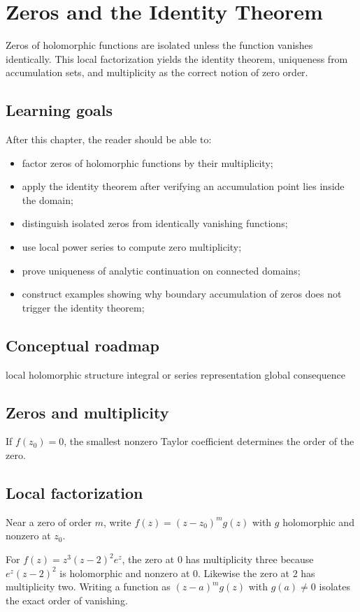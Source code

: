 \chapter{Zeros and the Identity Theorem}
\label{ch:iv07}

Zeros of holomorphic functions are isolated unless the function vanishes identically. This local factorization yields the identity theorem, uniqueness from accumulation sets, and multiplicity as the correct notion of zero order.

\section*{Learning goals}
After this chapter, the reader should be able to:
\begin{itemize}
\item factor zeros of holomorphic functions by their multiplicity;
\item apply the identity theorem after verifying an accumulation point lies inside the domain;
\item distinguish isolated zeros from identically vanishing functions;
\item use local power series to compute zero multiplicity;
\item prove uniqueness of analytic continuation on connected domains;
\item construct examples showing why boundary accumulation of zeros does not trigger the identity theorem;
\end{itemize}
\section*{Conceptual roadmap}
\volroadmap
  {local holomorphic structure}
  {integral or series representation}
  {global consequence}

\section{Zeros and multiplicity}
If $f(z_0)=0$, the smallest nonzero Taylor coefficient determines the order of the zero.

\section{Local factorization}
Near a zero of order $m$, write $f(z)=(z-z_0)^mg(z)$ with $g$ holomorphic and nonzero at $z_0$.

\begin{example}\label{ex:iv07-expand-01}
For \(f(z)=z^3(z-2)^2e^z\), the zero at \(0\) has multiplicity three because \(e^z(z-2)^2\) is holomorphic and nonzero at \(0\). Likewise the zero at \(2\) has multiplicity two. Writing a function as \((z-a)^m g(z)\) with \(g(a)\ne0\) isolates the exact order of vanishing.
\end{example}
